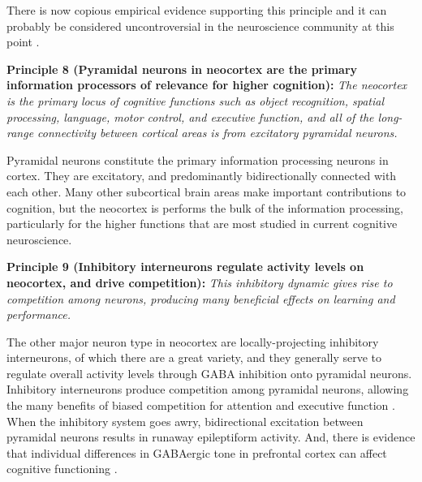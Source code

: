 \documentclass[11pt,twoside]{article}
\begin{document}
There is now copious empirical evidence supporting this principle and it can
probably be considered uncontroversial in the neuroscience community at this
point \cite{ltpsynapserefs}.

{\bf Principle 8 (Pyramidal neurons in neocortex are the primary information
  processors of relevance for higher cognition):} {\em The neocortex is the
  primary locus of cognitive functions such as object recognition, spatial
  processing, language, motor control, and executive function, and all of the
  long-range connectivity between cortical areas is from excitatory pyramidal
  neurons.} 

Pyramidal neurons constitute the primary information processing neurons in
cortex.  They are excitatory, and predominantly bidirectionally
connected with each other.  Many other subcortical brain areas make important
contributions to cognition, but the neocortex is performs the bulk of the
information processing, particularly for the higher functions that are most
studied in current cognitive neuroscience.

{\bf Principle 9 (Inhibitory interneurons regulate activity levels on
  neocortex, and drive competition):} {\em This
  inhibitory dynamic gives rise to competition among neurons, producing many
  beneficial effects on learning and performance.}

The other major neuron type in neocortex are locally-projecting inhibitory
interneurons, of which there are a great variety, and they generally serve to
regulate overall activity levels through GABA inhibition onto pyramidal
neurons.  Inhibitory interneurons produce competition among pyramidal neurons,
allowing the many benefits of biased competition for attention and executive
function \cite{DesimoneDuncan95,HerdBanichOReilly06}.  When the inhibitory
system goes awry, bidirectional excitation between pyramidal neurons results
in runaway epileptiform activity. And, there is evidence that individual
differences in GABAergic tone in prefrontal cortex can affect cognitive
functioning \cite{SnyderHutchisonNyhusEtAl10}.
\end{document}
